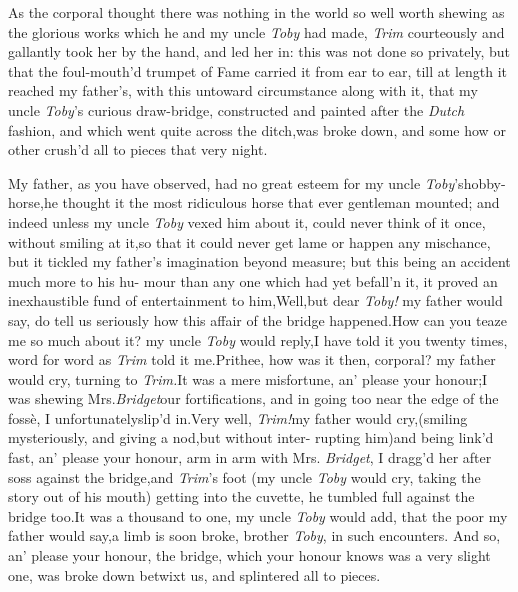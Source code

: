 \documentclass{article}
\begin{document}
As the corporal thought there was no\-thing in the world so well
worth shewing as the glorious works which he and my uncle
\textit{Toby} had made, \textit{Trim} courteous\-ly and gallantly took
her by the hand, and led her in: this was not done so private\-ly,
but that the foul-mouth’d trumpet of
Fame carried it from ear to ear, till at length it reached my
father’s, with this untoward circumstance along with it,\break
that my uncle \textit{Toby}’s curious draw-bridge, constructed and
painted after the \textit{Dutch} fashion, and which went quite
across the ditch,\tsk was broke down, and some how or other
crush’d all to pieces that very night.

My father, as you have observed, had no great esteem for my
uncle \textit{Toby}’s\break hobby-horse,\tsk he thought it the most
ri\-diculous horse that ever gentleman mou\-nt\-ed; and indeed unless my
uncle \textit{Toby} vexed him about it, could never think of it once,
without smiling at it,\tsh so that it could never get lame
or happen any mischance, but it tickled my father’s
imagination beyond measure; but this being an accident much more to
his hu- mour than any one which had yet befall’n it, it proved
an inexhaustible fund of entertainment to
him,\tsh Well,\tsh but dear \textit{Toby!} my father
would say, do tell us seriously how this affair of the bridge
happened.\tsh How can you teaze me so much about it? my uncle
\textit{Toby} would reply,\tsk I have told it you twenty times,
word for word as \textit{Trim} told it me.\tsk Pri\-thee, how was
it then, corporal? my father would cry, turning to
\textit{Trim.}\tsk It was a mere misfortune, an’ please your
honour;\tsk I was shewing Mrs.\@ \textit{Bridget}\break our
fortifications, and in going too near the edge of the fossè, I
unfortunately\break slip’d in.\tsk Very well, \textit{Trim!}\@ my
father would cry,\tsh (smiling mysteriously, and\break
giving a nod,\tsh but without inter-\break
rupting him)\tsh and being link’d\break
fast, an’ please your honour, arm in arm with Mrs.\@
\textit{Bridget}, I dragg’d her after 
soss against the bridge,\tsh and \textit{Trim}’s
foot (my uncle \textit{Toby} would cry, taking the story out of
his mouth) getting into the cuvette, he tumbled full against the
bridge too.\tsk It was a thousand to one, my uncle \textit{Toby}
would add, that the poor 
my father would say,\tsh a limb is soon broke, brother
\textit{Toby}, in such encounters.\break
\tsh And so, an’ please your honour, the bridge, which your
honour knows was a very slight one, was broke down betwixt us,
and splintered all to pieces.
\end{document}
